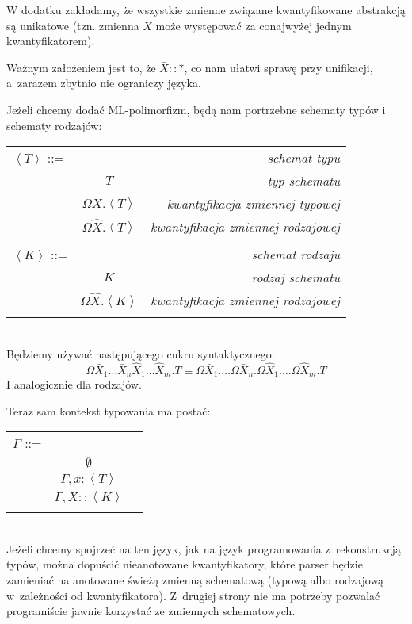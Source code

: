 \documentclass[11pt,leqno]{article}
\begin{document}
W dodatku zakładamy, że wszystkie zmienne związane kwantyfikowane abstrakcją są unikatowe (tzn. zmienna $X$ może
występować za conajwyżej jednym kwantyfikatorem).

Ważnym założeniem jest to, że $\bar{X}::*$, co nam ułatwi sprawę przy unifikacji, a~zarazem zbytnio nie ograniczy języka.
  
Jeżeli chcemy dodać ML-polimorfizm, będą nam portrzebne schematy typów i schematy rodzajów:

\begin{tabular}{| l c r |}
  \hline
  $\left<T\right>$ ::= &  & \textit{schemat typu} \\
   & $T$ & \textit{typ schematu} \\
   & $\Omega \bar{X}.\left<T\right>$ & \textit{kwantyfikacja zmiennej typowej} \\
   & $\Omega \widehat{X}.\left<T\right>$ & \textit{kwantyfikacja zmiennej rodzajowej} \\
   & & \\
  $\left<K\right>$ ::= &  & \textit{schemat rodzaju} \\
   & $K$ & \textit{rodzaj schematu}\\
   & $\Omega \widehat{X}.\left<K\right>$ & \textit{kwantyfikacja zmiennej rodzajowej} \\
   & & \\
  \hline
\end{tabular} \\

Będziemy używać następującego cukru syntaktycznego:
\[
\Omega \bar{X}_1 \dots \bar{X}_n \widehat{X}_1 \dots \widehat{X}_m.T \equiv 
\Omega \bar{X}_1. \dots \Omega \bar{X}_n. \Omega \widehat{X}_1. \dots \Omega \widehat{X}_m.T
\]
I analogicznie dla rodzajów.

Teraz sam kontekst typowania ma postać:

\begin{tabular}{| l c r |}
  \hline
  $\Gamma$ ::= &  & \\
   & $\emptyset$ & \\
   & $\Gamma, x:\left<T\right>$ & \\
   & $\Gamma, X::\left<K\right>$ & \\
   & & \\
  \hline
\end{tabular} \\

Jeżeli chcemy spojrzeć na ten język, jak na język programowania z~rekonstrukcją typów, można
dopuścić nieanotowane kwantyfikatory, które parser będzie zamieniać na anotowane świeżą zmienną schematową 
(typową albo rodzajową w~zależności od kwantyfikatora). Z~drugiej strony nie ma potrzeby pozwalać programiście
jawnie korzystać ze zmiennych schematowych.
\end{document}
